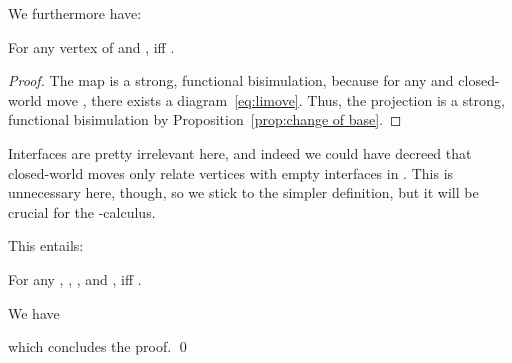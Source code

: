 \documentclass{LMCS}
\theoremstyle{plain}\newtheorem{satz}[thm]{Satz}
\begin{document}
We furthermore have:
\begin{lem}\label{lem:barebat:botL}
  For any vertex  of  and
  ,  iff .
\end{lem}
\begin{proof}
  The map  is a strong, functional bisimulation,
  because for any  and closed-world move , there exists a diagram~\eqref{eq:limove}.  Thus, the
  projection  is a strong, functional bisimulation by
  Proposition~\ref{prop:change of base}.
\end{proof}
\begin{rem}
  Interfaces are pretty irrelevant here, and indeed we could have
  decreed that closed-world moves only relate vertices with empty
  interfaces in . This is unnecessary here, though, so we stick
  to the simpler definition, but it will be crucial for the
  -calculus.
\end{rem}

This entails:
\begin{cor}\label{cor:SSSLI}
  For any , , , and
  ,  iff .
\end{cor}
\proof We have
  \begin{center}
     
    

      


      


      


      
\end{center}
which concludes the proof.
\qed
\end{document}
